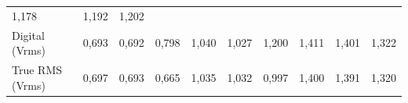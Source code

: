 \documentclass[14pt, oneside]{book}
\theoremstyle{definition}
\begin{document}
\begin{table}[H]
{\begin{tabular}{ l l l l l l l l l l }
                            \multicolumn{1}{p{0.783cm}|}{1,178 \centering } &
                            \multicolumn{1}{p{0.933cm}|}{1,192 \centering } &
                            \multicolumn{1}{p{0.933cm}|}{1,202 \centering }
                      \\  
                        \cline{1-1}\cline{2-2}\cline{3-3}\cline{4-4}\cline{5-5}\cline{6-6}\cline{7-7}\cline{8-8}\cline{9-9}\cline{10-10}  
                            \multicolumn{1}{|p{3.033cm}|}{Digital (Vrms) \centering } &
                            \multicolumn{1}{p{1.367cm}|}{0,693 \centering } &
                            \multicolumn{1}{p{1.333cm}|}{0,692 \centering } &
                            \multicolumn{1}{p{1.000cm}|}{0,798 \centering } &
                            \multicolumn{1}{p{1.350cm}|}{1,040 \centering } &
                            \multicolumn{1}{p{1.050cm}|}{1,027 \centering } &
                            \multicolumn{1}{p{0.983cm}|}{1,200 \centering } &
                            \multicolumn{1}{p{0.783cm}|}{1,411 \centering } &
                            \multicolumn{1}{p{0.933cm}|}{1,401 \centering } &
                            \multicolumn{1}{p{0.933cm}|}{1,322 \centering }
                      \\  
                        \cline{1-1}\cline{2-2}\cline{3-3}\cline{4-4}\cline{5-5}\cline{6-6}\cline{7-7}\cline{8-8}\cline{9-9}\cline{10-10}  
                            \multicolumn{1}{|p{3.033cm}|}{True RMS (Vrms) \centering } &
                            \multicolumn{1}{p{1.367cm}|}{0,697 \centering } &
                            \multicolumn{1}{p{1.333cm}|}{0,693 \centering } &
                            \multicolumn{1}{p{1.000cm}|}{0,665 \centering } &
                            \multicolumn{1}{p{1.350cm}|}{1,035 \centering } &
                            \multicolumn{1}{p{1.050cm}|}{1,032 \centering } &
                            \multicolumn{1}{p{0.983cm}|}{0,997 \centering } &
                            \multicolumn{1}{p{0.783cm}|}{1,400 \centering } &
                            \multicolumn{1}{p{0.933cm}|}{1,391 \centering } &
                            \multicolumn{1}{p{0.933cm}|}{1,320 \centering }
                      \\  
                        \hline
                    
                    \end{tabular} }
                \end{table}
\end{document}
